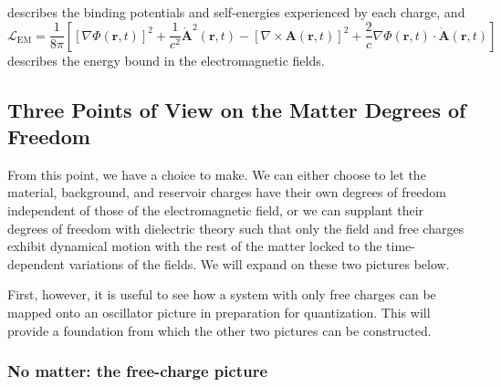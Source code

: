 \documentclass{article}
\begin{document}
describes the binding potentials and self-energies experienced by each charge, and
\begin{equation}
\mathcal{L}_\mathrm{EM} = \frac{1}{8\pi}\left[\left[\nabla\Phi(\mathbf{r},t)\right]^2 + \frac{1}{c^2}\dot{\mathbf{A}}^2(\mathbf{r},t) - \left[\nabla\times\mathbf{A}(\mathbf{r},t)\right]^2 + \frac{2}{c}\nabla\Phi(\mathbf{r},t)\cdot\dot{\mathbf{A}}(\mathbf{r},t)\right]
\end{equation}
describes the energy bound in the electromagnetic fields.









\subsection{Three Points of View on the Matter Degrees of Freedom}

From this point, we have a choice to make. We can either choose to let the material, background, and reservoir charges have their own degrees of freedom independent of those of the electromagnetic field, or we can supplant their degrees of freedom with dielectric theory such that only the field and free charges exhibit dynamical motion with the rest of the matter locked to the time-dependent variations of the fields. We will expand on these two pictures below.

First, however, it is useful to see how a system with only free charges can be mapped onto an oscillator picture in preparation for quantization. This will provide a foundation from which the other two pictures can be constructed.






\subsubsection{No matter: the free-charge picture}\label{sec:noMatter}
\end{document}
